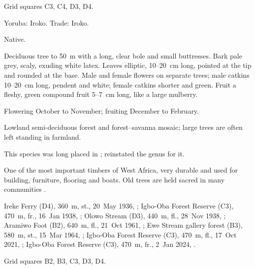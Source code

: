  Grid squares C3, C4, D3, D4.

\begin{center}
\end{center}

\label{sp:MOR02}

 

 Yoruba: Iroko. Trade: Iroko.

 Native.

 Deciduous tree to 50~m with a long, clear bole and
small buttresses. Bark pale grey, scaly, exuding white latex. Leaves
elliptic, 10--20~cm long, pointed at the tip and rounded at the base.
Male and female flowers on separate trees; male catkins 10--20~cm
long, pendent and white; female catkins shorter and green. Fruit a
fleshy, green compound fruit 5--7~cm long, like a large mulberry.

 Flowering October to November; fruiting December to
February.

 Lowland semi-deciduous forest and forest--savanna
mosaic; large trees are often left standing in farmland.

 This species was long placed in ;
\citet{berg1982} reinstated the genus  for it.

 One of the most important timbers of West Africa, very
durable and used for building, furniture, flooring and boats. Old
trees are held sacred in many communities \citep{keay1989,louppe2008}.

 Ireke Ferry (D4), 360~m, st., 20~May 1936, ;
Igbo-Oba Forest Reserve (C3), 470~m, fr., 16~Jan 1938, ;
Olowo Stream (D3), 440~m, fl., 28~Nov 1938, ;
Aramiwo Foot (B2), 640~m, fl., 21~Oct 1961, ;
Ewe Stream gallery forest (B3), 580~m, st., 15~Mar 1964, ;
Igbo-Oba Forest Reserve (C3), 470~m, fl., 17~Oct 2021, ;
Igbo-Oba Forest Reserve (C3), 470~m, fr., 2~Jan 2024, .

 Grid squares B2, B3, C3, D3, D4.

\begin{center}
\end{center}
